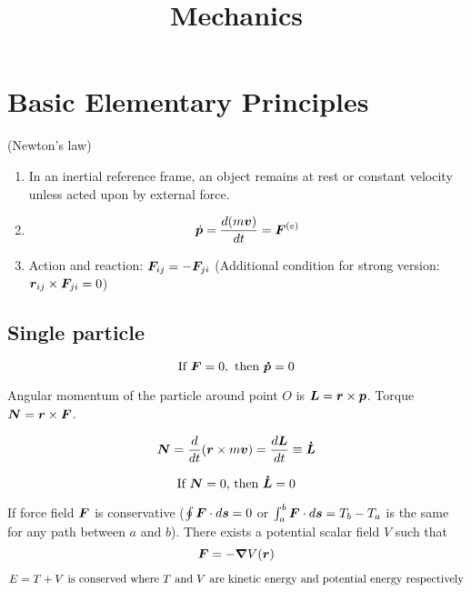 \documentclass[12pt]{article}
\title{Mechanics}
\begin{document}
	\maketitle
	
\section{Basic Elementary Principles}

\begin{theorem}(Newton's law)
	\begin{enumerate}
		\item  \textnormal{In an inertial reference frame, an object remains at rest or constant velocity unless acted upon by external force.}
		\item  $$\dot{\boldsymbol{p}} = \frac{d(m\boldsymbol{v})}{dt} = \boldsymbol{F}^{(e)}$$
		\item  \textnormal{Action and reaction: $\boldsymbol{F}_{ij} = -\boldsymbol{F}_{ji}$ (Additional condition for strong version: $\boldsymbol{r}_{ij} \times \boldsymbol{F}_{ji} = 0$)}
	\end{enumerate}
\end{theorem}
\subsection{Single particle}

 \begin{theorem}
 	$$\text{If } \boldsymbol{F} = 0, \text{ then } \boldsymbol{\dot p} = 0$$
 \end{theorem}

Angular momentum of the particle around point $O$ is $\boldsymbol{L} = \boldsymbol{r} \times \boldsymbol{p}$. Torque $\boldsymbol{N} = \boldsymbol{r} \times \boldsymbol{F}$. 

$$ \boldsymbol{N} = \frac{d}{dt} (\boldsymbol{r} \times m\boldsymbol{v}) = \frac{d \boldsymbol{L}}{dt} \equiv \boldsymbol{\dot L}$$

\begin{theorem}
	$$\textnormal{If $\boldsymbol{N} = 0$,  then $\boldsymbol{\dot L} = 0$} $$
\end{theorem}

If force field $\boldsymbol{F}$ is conservative ($\oint \boldsymbol{F} \cdot d \boldsymbol{s} = 0$ or $\int_a^b \boldsymbol{F} \cdot d\boldsymbol{s} = T_b - T_a$ is the same for any path between $a$ and $b$). 
There exists a potential scalar field $V$ such that $$\boldsymbol{F} = -\grad{V(\boldsymbol{r})}$$

\begin{theorem}
	 $$E = T + V \textnormal{ is conserved where } T \textnormal{ and } V \textnormal{ are kinetic energy and potential energy respectively}$$
\end{theorem}
\end{document}
